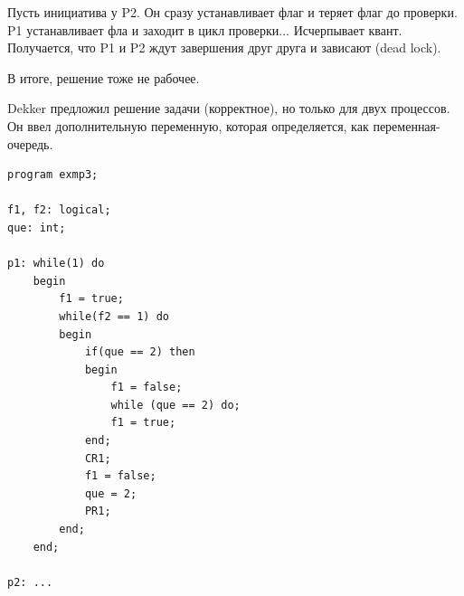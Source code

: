 \documentclass[14pt, a4paper]{article}
\begin{document}
	Пусть инициатива у P2. Он сразу устанавливает флаг и теряет флаг до проверки. P1 устанавливает фла и заходит в цикл проверки... Исчерпывает квант. Получается, что P1 и P2 ждут завершения друг друга и зависают (dead lock).
	
	В итоге, решение тоже не рабочее.
	
	Dekker предложил решение задачи (корректное), но только для двух процессов. Он ввел дополнительную переменную, которая определяется, как переменная-очередь.
	
	\begin{lstlisting}
program exmp3;

f1, f2: logical;
que: int;

p1: while(1) do
	begin
		f1 = true;
		while(f2 == 1) do
		begin
			if(que == 2) then
			begin 
				f1 = false;
				while (que == 2) do;
				f1 = true;
			end;
			CR1;
			f1 = false;
			que = 2;
			PR1;
		end;
	end;

p2: ...
	\end{lstlisting}
\end{document}
